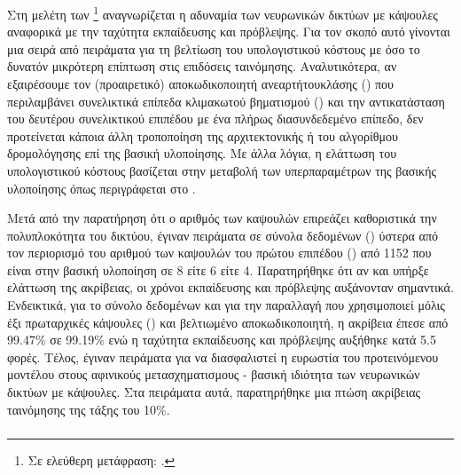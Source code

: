 \subsubsection{}

Στη μελέτη των  \footnote{Σε ελεύθερη μετάφραση: .} \cite{shiri2020quick} αναγνωρίζεται η αδυναμία των νευρωνικών δικτύων με κάψουλες αναφορικά με την ταχύτητα εκπαίδευσης και πρόβλεψης. Για τον σκοπό αυτό γίνονται μια σειρά από πειράματα για τη βελτίωση του υπολογιστικού κόστους με όσο το δυνατόν μικρότερη επίπτωση στις επιδόσεις ταινόμησης. Αναλυτικότερα, αν εξαιρέσουμε τον (προαιρετικό) αποκωδικοποιητή ανεαρτήτου\textendash κλάσης () που περιλαμβάνει συνελικτικά επίπεδα κλιμακωτού βηματισμού () και την αντικατάσταση του δευτέρου συνελικτικού επιπέδου με ένα πλήρως διασυνδεδεμένο επίπεδο, δεν προτείνεται κάποια άλλη τροποποίηση της αρχιτεκτονικής ή του αλγορίθμου δρομολόγησης επί της βασική υλοποίησης. Με άλλα λόγια, η ελάττωση του υπολογιστικού κόστους βασίζεται στην μεταβολή των υπερπαραμέτρων της βασικής υλοποίησης όπως περιγράφεται στο \cite{sabour2017dynamic}. 

Μετά από την παρατήρηση ότι ο αριθμός των καψουλών επιρεάζει καθοριστικά την πολυπλοκότητα του δικτύου, έγιναν πειράματα σε σύνολα δεδομένων () ύστερα από τον περιορισμό του αριθμού των καψουλών του πρώτου επιπέδου () από 1152 που είναι στην βασική υλοποίηση σε 8 είτε 6 είτε 4. Παρατηρήθηκε ότι αν και υπήρξε ελάττωση της ακρίβειας, οι χρόνοι εκπαίδευσης και πρόβλεψης αυξάνονταν σημαντικά. Ενδεικτικά, για το σύνολο δεδομένων  και για την παραλλαγή που χρησιμοποιεί μόλις έξι πρωταρχικές κάψουλες () και βελτιωμένο αποκωδικοποιητή, η ακρίβεια έπεσε από 99.47\% σε 99.19\% ενώ η ταχύτητα εκπαίδευσης και πρόβλεψης αυξήθηκε κατά 5.5 φορές. Τέλος, έγιναν πειράματα για να διασφαλιστεί η ευρωστία του προτεινόμενου μοντέλου στους αφινικούς μετασχηματισμους - βασική ιδιότητα των νευρωνικών δικτύων με κάψουλες. Στα πειράματα αυτά, παρατηρήθηκε μια πτώση ακρίβειας ταινόμησης της τάξης του 10\%.

\subsubsection{}

